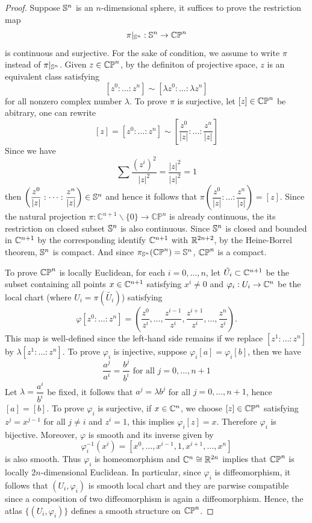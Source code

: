 \begin{proof}
    Suppose $\mathbb{S}^n$ is an $n$-dimensional sphere, it suffices to prove the restriction map $$\pi|_{\mathbb{S}^n}: \mathbb{S}^n \to \mathbb{CP}^n$$ is continuous and surjective. For the sake of condition, we assume to write $\pi$ instead of $\pi|_{\mathbb{S}^n}$. Given $z \in \mathbb{CP}^n$, by the definiton of projective space, $z$ is an equivalent class satisfying
    \[
        [z^0: \dots : z^n] \sim [\lambda z^0: \dots :\lambda z^n]
    \]
    for all nonzero complex number $\lambda$. To prove $\pi$ is surjective, let $[z] \in \mathbb{CP}^n$ be abitrary, one can rewrite 
    \[
        [z] = [z^0: \dots : z^n] \sim \left[\frac{z^0}{|z|}: \dots : \frac{z^n}{|z|}\right]
    \]
    Since we have 
    \[
        \sum \dfrac{(z^i)^2}{|z|^2} = \frac{|z|^2}{|z|^2} = 1
    \]
    then $\left(\dfrac{z^0}{|z|}: \dots : \dfrac{z^n}{|z|}\right) \in \mathbb{S}^n$ and hence it follows that $\pi\left(\dfrac{z^0}{|z|}: \dots : \dfrac{z^n}{|z|}\right) = [z]$. Since the natural projection  $\pi: \mathbb{C}^{n+1} \backslash\{0\} \rightarrow \mathbb{C} \mathbb{P}^n$ is already continuous, the its restriction on closed subset $\mathbb{S}^n$ is also continuous. Since $\mathbb{S}^{n}$ is closed and bounded in $\mathbb{C}^{n + 1}$ by the corresponding identify $\mathbb{C}^{n + 1}$ with $\mathbb{R}^{2n + 2}$, by the Heine-Borrel theorem, $\mathbb{S}^n$ is compact. And since $\pi_{\mathbb{S}^n}(\mathbb{CP}^n) =\mathbb{S}^n$, $\mathbb{CP}^n$ is a compact.

    To prove $\mathbb{CP}^n$ is locally Euclidean, for each $i = 0,\dots,n$, let $\tilde{U_i}\subset \mathbb{C}^{n + 1}$ be the subset containing all points $x \in \mathbb{C}^{n + 1}$ satisfying $x^{i} \neq 0$ and $\varphi_i: U_i \to \mathbb{C}^{n}$ be the local chart (where $U_i = \pi(\tilde{U_i})$) satisfying
    \[  
        \varphi[z^0: \dots : z^n] = \left(\frac{z^0}{z^i},\dots,\frac{z^{i -1}}{z^{i}},\frac{z^{i + 1}}{z^{i}}, \dots,\frac{z^n}{z^i}\right).
    \]
    This map is well-defined since the left-hand side remains if we replace $[z^1: \dots : z^n]$ by $\lambda[z^1: \dots : z^n]$. To prove $\varphi_i$ is injective, suppose $\varphi_i[a] = \varphi_i[b]$, then we have 
    \[  
        \frac{a^j}{a^i} = \frac{b^j}{b^i} \text{ for all }j = 0, \dots,n + 1
    \]
    Let $\lambda = \dfrac{a^i}{b^i}$ be fixed, it follows that $a^j = \lambda b^j$ for all $j = 0,\dots, n + 1$, hence $[a] = [b]$. To prove $\varphi_i$ is surjective, if $x \in \mathbb{C}^n$, we choose $[z] \in \mathbb{CP}^n$ satisfying $z^j = x^{j - 1}$ for all $j \neq i$ and $z^i = 1$, this implies $\varphi_{i}[z] =  x$. Therefore $\varphi_i$ is bijective. Moreover, $\varphi$ is smooth and its inverse given by
    \[
        \varphi_i^{-1}(x^i) = [x^0,\dots,x^{i - 1}, 1, x^{i + 1},\dots,x^n]
    \]
    is also smooth. Thus $\varphi_i$ is homeomorphism and $\mathbb{C}^n \cong \mathbb{R}^{2n}$ implies that $\mathbb{CP}^n$ is locally $2n$-dimensional Euclidean. In particular, since $\varphi_i$  is diffeomorphism, it follows that $(U_i,\varphi_i)$ is smooth local chart and they are parwise compatible since a composition of two diffeomorphism is again a diffeomorphism. Hence, the atlas $\{(U_i,\varphi_i)\}$ defines a smooth structure on $\mathbb{CP}^n$.


\end{proof}
